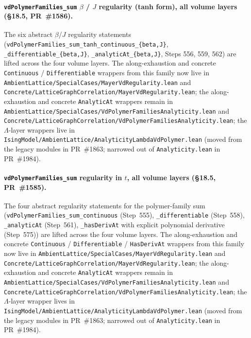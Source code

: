\documentclass[a4paper,11pt]{article}
\begin{document}
\paragraph{\texttt{vdPolymerFamilies\_sum} $\beta$ / $J$ regularity
(tanh form), all volume layers (\S18.5, PR~\#1586).} The six
abstract $\beta$/$J$ regularity statements
(\texttt{vdPolymerFamilies\_sum\_tanh\_continuous\_\{beta,J\}},
\texttt{\_differentiable\_\{beta,J\}},
\texttt{\_analyticAt\_\{beta,J\}}, Steps 556, 559, 562) are lifted
across the four volume layers. The along-exhaustion
and concrete \texttt{Continuous} / \texttt{Differentiable} wrappers from
this family now live in
\texttt{AmbientLattice/SpecialCases/MayerVdRegularity.lean}
and
\texttt{Concrete/LatticeGraphCorrelation/MayerVdRegularity.lean};
the along-exhaustion and concrete \texttt{AnalyticAt} wrappers remain in
\texttt{AmbientLattice/SpecialCases/VdPolymerFamiliesAnalyticity.lean}
and
\texttt{Concrete/LatticeGraphCorrelation/VdPolymerFamiliesAnalyticity.lean};
the $\Lambda$-layer wrappers live in
\texttt{IsingModel/AmbientLattice/AnalyticityLambdaVdPolymer.lean}
(moved from the legacy modules in PR~\#1863; narrowed out of
\texttt{Analyticity.lean} in PR~\#1984).

\paragraph{\texttt{vdPolymerFamilies\_sum} regularity in $t$, all
volume layers (\S18.5, PR~\#1585).} The four abstract regularity
statements for the polymer-family sum
(\texttt{vdPolymerFamilies\_sum\_continuous} (Step~555),
\texttt{\_differentiable} (Step~558), \texttt{\_analyticAt}
(Step~561), \texttt{\_hasDerivAt} with explicit polynomial
derivative (Step~575)) are lifted across the four volume layers.
The along-exhaustion
and concrete \texttt{Continuous} / \texttt{Differentiable} /
\texttt{HasDerivAt} wrappers from this family now live in
\texttt{AmbientLattice/SpecialCases/MayerVdRegularity.lean}
and
\texttt{Concrete/LatticeGraphCorrelation/MayerVdRegularity.lean};
the along-exhaustion and concrete \texttt{AnalyticAt} wrappers remain in
\texttt{AmbientLattice/SpecialCases/VdPolymerFamiliesAnalyticity.lean}
and
\texttt{Concrete/LatticeGraphCorrelation/VdPolymerFamiliesAnalyticity.lean};
the $\Lambda$-layer wrapper lives in
\texttt{IsingModel/AmbientLattice/AnalyticityLambdaVdPolymer.lean}
(moved from the legacy modules in PR~\#1863; narrowed out of
\texttt{Analyticity.lean} in PR~\#1984).
\end{document}
